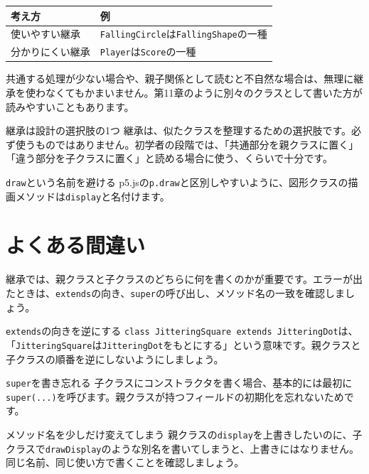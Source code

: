 \begin{center}
\begin{tabular}{ll}
\toprule
考え方 & 例 \\
\midrule
使いやすい継承 & \texttt{FallingCircle}は\texttt{FallingShape}の一種 \\
分かりにくい継承 & \texttt{Player}は\texttt{Score}の一種 \\
\bottomrule
\end{tabular}
\end{center}

共通する処理が少ない場合や、親子関係として読むと不自然な場合は、無理に継承を使わなくてもかまいません。第11章のように別々のクラスとして書いた方が読みやすいこともあります。

\begin{notebox}{継承は設計の選択肢の1つ}
継承は、似たクラスを整理するための選択肢です。必ず使うものではありません。初学者の段階では、「共通部分を親クラスに置く」「違う部分を子クラスに置く」と読める場合に使う、くらいで十分です。
\end{notebox}

\begin{notebox}{\texttt{draw}という名前を避ける}
p5.jsの\texttt{p.draw}と区別しやすいように、図形クラスの描画メソッドは\texttt{display}と名付けます。
\end{notebox}

\section{よくある間違い}

継承では、親クラスと子クラスのどちらに何を書くのかが重要です。エラーが出たときは、\texttt{extends}の向き、\texttt{super}の呼び出し、メソッド名の一致を確認しましょう。

\begin{mistakebox}{\texttt{extends}の向きを逆にする}
\texttt{class JitteringSquare extends JitteringDot}は、「\texttt{JitteringSquare}は\texttt{JitteringDot}をもとにする」という意味です。親クラスと子クラスの順番を逆にしないようにしましょう。
\end{mistakebox}

\begin{mistakebox}{\texttt{super}を書き忘れる}
子クラスにコンストラクタを書く場合、基本的には最初に\texttt{super(...)}を呼びます。親クラスが持つフィールドの初期化を忘れないためです。
\end{mistakebox}

\begin{mistakebox}{メソッド名を少しだけ変えてしまう}
親クラスの\texttt{display}を上書きしたいのに、子クラスで\texttt{drawDisplay}のような別名を書いてしまうと、上書きにはなりません。同じ名前、同じ使い方で書くことを確認しましょう。
\end{mistakebox}

